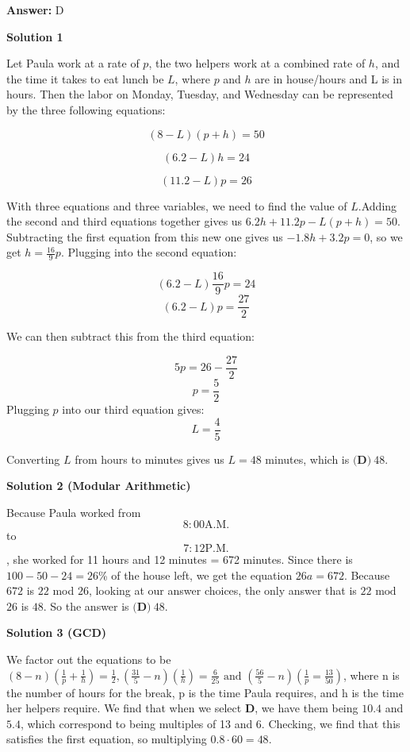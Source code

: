 \begin{enumerate}
 \textbf{Answer: }D



\textbf{Solution 1}

Let Paula work at a rate of $p$, the two helpers work at a combined rate of $h$, and the time it takes to eat lunch be $L$, where $p$ and $h$ are in house/hours and L is in hours. Then the labor on Monday, Tuesday, and Wednesday can be represented by the three following equations:

 
 \[(8-L)(p+h)=50\]

 \[(6.2-L)h=24\]

 \[(11.2-L)p=26\]

 With three equations and three variables, we need to find the value of $L$.Adding the second and third equations together gives us $6.2h+11.2p-L(p+h)=50$. Subtracting the first equation from this new one gives us $-1.8h+3.2p=0$, so we get $h=\frac{16}{9}p$. Plugging into the second equation:

 
 \[(6.2-L)\frac{16}{9}p=24\]
 \[(6.2-L)p=\frac{27}{2}\]

 We can then subtract this from the third equation:

 
 \[5p=26-\frac{27}{2}\]
 \[p=\frac{5}{2}\]Plugging $p$ into our third equation gives: 
 \[L=\frac{4}{5}\]

 Converting $L$ from hours to minutes gives us $L=48$ minutes, which is $\boxed{\textbf{(D)}\ 48}$.

 



\textbf{Solution 2 (Modular Arithmetic)}

Because Paula worked from 
 \[8:00 \text{A.M.}\] to 
 \[7:12 \text{P.M.}\], she worked for 11 hours and 12 minutes = 672 minutes. Since there is $100-50-24=26$\% of the house left, we get the equation $26a=672$. Because $672$ is $22$ mod $26$, looking at our answer choices, the only answer that is $22$ $\text{mod}$ $26$ is $48$. So the answer is $\boxed{\textbf{(D)}\ 48}$.

 



\textbf{Solution 3 (GCD)}

We factor out the equations to be $(8-n)\left(\frac{1}{p}+\frac{1}{h}\right)=\frac{1}{2},\left(\frac{31}{5}-n\right)\left(\frac{1}{h}\right)=\frac{6}{25} \text{ and } \left(\frac{56}{5}-n\right)\left(\frac{1}{p}=\frac{13}{50}\right)$, where n is the number of hours for the break, p is the time Paula requires, and h is the time her helpers require. We find that when we select $\mathbf{D}$, we have them being $10.4$ and $5.4$, which correspond to being multiples of 13 and 6. Checking, we find that this satisfies the first equation, so multiplying $0.8\cdot 60= \boxed{48.}$




\end{enumerate}

